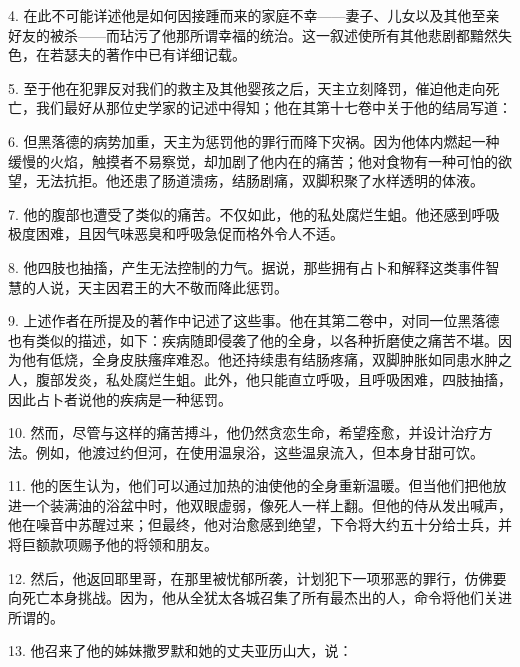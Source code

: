 4. 在此不可能详述他是如何因接踵而来的家庭不幸——妻子、儿女以及其他至亲好友的被杀——而玷污了他那所谓幸福的统治。这一叙述使所有其他悲剧都黯然失色，在若瑟夫的著作中已有详细记载。\par

5. 至于他在犯罪反对我们的救主及其他婴孩之后，天主立刻降罚，催迫他走向死亡，我们最好从那位史学家的记述中得知；他在其第十七卷中关于他的结局写道：\par

6. 但黑落德的病势加重，天主为惩罚他的罪行而降下灾祸。因为他体内燃起一种缓慢的火焰，触摸者不易察觉，却加剧了他内在的痛苦；他对食物有一种可怕的欲望，无法抗拒。他还患了肠道溃疡，结肠剧痛，双脚积聚了水样透明的体液。\par

7. 他的腹部也遭受了类似的痛苦。不仅如此，他的私处腐烂生蛆。他还感到呼吸极度困难，且因气味恶臭和呼吸急促而格外令人不适。\par

8. 他四肢也抽搐，产生无法控制的力气。据说，那些拥有占卜和解释这类事件智慧的人说，天主因君王的大不敬而降此惩罚。\par

9. 上述作者在所提及的著作中记述了这些事。他在其第二卷中，对同一位黑落德也有类似的描述，如下：疾病随即侵袭了他的全身，以各种折磨使之痛苦不堪。因为他有低烧，全身皮肤瘙痒难忍。他还持续患有结肠疼痛，双脚肿胀如同患水肿之人，腹部发炎，私处腐烂生蛆。此外，他只能直立呼吸，且呼吸困难，四肢抽搐，因此占卜者说他的疾病是一种惩罚。\par

10. 然而，尽管与这样的痛苦搏斗，他仍然贪恋生命，希望痊愈，并设计治疗方法。例如，他渡过约但河，在使用温泉浴，这些温泉流入，但本身甘甜可饮。\par

11. 他的医生认为，他们可以通过加热的油使他的全身重新温暖。但当他们把他放进一个装满油的浴盆中时，他双眼虚弱，像死人一样上翻。但他的侍从发出喊声，他在噪音中苏醒过来；但最终，他对治愈感到绝望，下令将大约五十分给士兵，并将巨额款项赐予他的将领和朋友。\par

12. 然后，他返回耶里哥，在那里被忧郁所袭，计划犯下一项邪恶的罪行，仿佛要向死亡本身挑战。因为，他从全犹太各城召集了所有最杰出的人，命令将他们关进所谓的。\par

13. 他召来了他的姊妹撒罗默和她的丈夫亚历山大，说：\par


